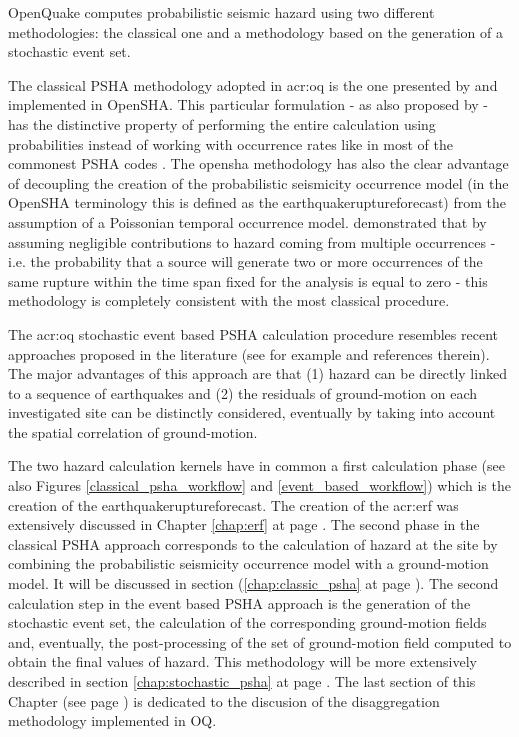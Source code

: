 OpenQuake computes probabilistic seismic hazard using two different 
methodologies: the classical one and a methodology based on the 
generation of a stochastic event set.

The classical PSHA methodology adopted in \gls{acr:oq} is the one 
presented by \citet{field2003} and implemented in OpenSHA. 
This particular formulation - as also proposed by \citet{chiang1984} - 
has the distinctive property of performing the entire calculation using 
probabilities instead of working with occurrence rates like in most 
of the commonest PSHA codes \citep[see for instance][]{bender1987}. 
%
The \gls{opensha} methodology has also the clear advantage of decoupling the 
creation of the probabilistic seismicity occurrence model (in the OpenSHA 
terminology this is defined as the \gls{earthquakeruptureforecast}) from the 
assumption of a Poissonian temporal occurrence model. 
%
\citet{field2003} demonstrated that by assuming negligible contributions to 
hazard coming from multiple occurrences - i.e. the probability that a source 
will generate two or more occurrences of the same rupture within the time 
span fixed for the analysis is equal to zero - this methodology is 
completely consistent with the most classical procedure.

The \gls{acr:oq} stochastic event based PSHA calculation procedure 
resembles recent approaches proposed in the literature (see for example 
\citet{musson2000} and references therein). 
%
The major advantages of this approach are that (1) hazard can be directly 
linked to a sequence of earthquakes and (2) the residuals of ground-motion 
on each investigated site can be distinctly considered, eventually by 
taking into account the spatial correlation of ground-motion.

The two hazard calculation kernels have in common a first calculation 
phase (see also Figures \ref{classical_psha_workflow} and 
\ref{event_based_workflow}) which is the creation of the 
\gls{earthquakeruptureforecast}. 
The creation of the \gls{acr:erf} was extensively discussed in Chapter 
\ref{chap:erf} at page \pageref{chap:erf}.
%
The second phase in the classical PSHA approach corresponds to the 
calculation of hazard at the site by combining the probabilistic 
seismicity occurrence model with a ground-motion model. 
It will be discussed in section (\ref{chap:classic_psha} 
at page \pageref{chap:classic_psha}).
%
The second calculation step in the event based PSHA approach is the 
generation of the stochastic event set, the calculation of the 
corresponding ground-motion fields and, eventually, the post-processing 
of the set of ground-motion field computed to obtain the final values 
of hazard. This methodology will be more extensively described in section 
\ref{chap:stochastic_psha} at page \pageref{chap:stochastic_psha}.
%
The last section of this Chapter (see page \pageref{sec:disaggregation}) 
is dedicated to the discusion of the disaggregation methodology implemented 
in OQ.
